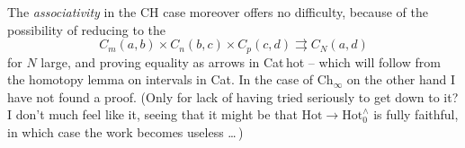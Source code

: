\documentclass[11pt]{article}
\newcommand{\HotO}{\mathrm{Hot}_0^{\wedge}}
\begin{document}
The \textit{associativity} in the CH case moreover offers no difficulty, because of the possibility of reducing to the
\[
C_m(a,b)\times C_n(b,c)\times C_p(c,d)\rightrightarrows C_N(a,d)
\]
for $N$ large, and proving equality as arrows in Cat\,hot -- which will follow from the homotopy lemma %
on intervals in Cat. In the case of $\mathrm{Ch}_{\infty}$ on the other hand I have not found a proof. (Only for lack of having tried seriously to get down to it? I don't much feel like it, seeing that it might be that $\mathrm{Hot}\longrightarrow\HotO$ is fully faithful, in which case the work becomes useless \dots\,)
\end{document}

